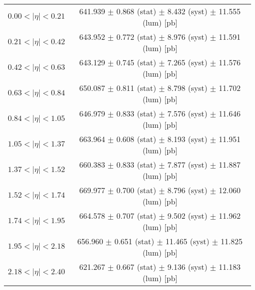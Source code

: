 \begin{tabular}{lc}
\hline
$0.00 < |\eta| <0.21$          & 641.939 $\pm$ 0.868 (stat) $\pm$ 8.432 (syst) $\pm$ 11.555 (lum) [pb]  \\
$0.21 < |\eta| <0.42$          & 643.952 $\pm$ 0.772 (stat) $\pm$ 8.976 (syst) $\pm$ 11.591 (lum) [pb]  \\
$0.42 < |\eta| <0.63$          & 643.129 $\pm$ 0.745 (stat) $\pm$ 7.265 (syst) $\pm$ 11.576 (lum) [pb]  \\
$0.63 < |\eta| <0.84$          & 650.087 $\pm$ 0.811 (stat) $\pm$ 8.798 (syst) $\pm$ 11.702 (lum) [pb]  \\
$0.84 < |\eta| <1.05$          & 646.979 $\pm$ 0.833 (stat) $\pm$ 7.576 (syst) $\pm$ 11.646 (lum) [pb]  \\
$1.05 < |\eta| <1.37$          & 663.964 $\pm$ 0.608 (stat) $\pm$ 8.193 (syst) $\pm$ 11.951 (lum) [pb]  \\
$1.37 < |\eta| <1.52$          & 660.383 $\pm$ 0.833 (stat) $\pm$ 7.877 (syst) $\pm$ 11.887 (lum) [pb]  \\
$1.52 < |\eta| <1.74$          & 669.977 $\pm$ 0.700 (stat) $\pm$ 8.796 (syst) $\pm$ 12.060 (lum) [pb]  \\
$1.74 < |\eta| <1.95$          & 664.578 $\pm$ 0.707 (stat) $\pm$ 9.502 (syst) $\pm$ 11.962 (lum) [pb]  \\
$1.95 < |\eta| <2.18$          & 656.960 $\pm$ 0.651 (stat) $\pm$ 11.465 (syst) $\pm$ 11.825 (lum) [pb]  \\
$2.18 < |\eta| <2.40$          & 621.267 $\pm$ 0.667 (stat) $\pm$ 9.136 (syst) $\pm$ 11.183 (lum) [pb]  \\
\hline
\end{tabular}
